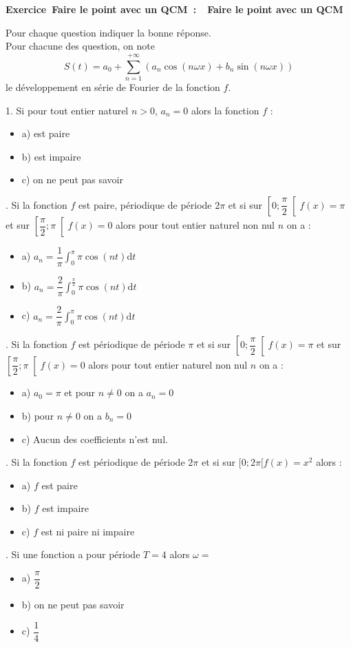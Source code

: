 \documentclass[11pt,a4paper]{article}
\newcounter{numexos}%
\newcommand{\bex}[2]{%
\def\bextitle{#1}%
\addtocounter{numexos}{1}%
\begin{tcolorbox}[colback=white,colframe=black!30,arc=3pt,boxrule=0.6pt,
  left=4mm,right=4mm,top=1mm,bottom=2mm]%
  \textbf{Exercice~\thenumexos\ifx\bextitle\empty\else~:~~#1\fi}\par
  #2%
\end{tcolorbox}}
\begin{document}
\bex{Faire le point avec un QCM}{
Pour chaque question indiquer la bonne réponse. \\
Pour chacune des question, on note $$S(t)=a_0+ \sum\limits_{n=1}^{+\infty} (a_n\cos(n\omega x)+b_n\sin(n\omega x))$$ le développement en série de Fourier de la fonction $f$.  

\bigskip

1. Si pour tout entier naturel $n > 0$, $a_n=0$ alors la fonction $f$ :
\begin{itemize}[label=$\square$]
  \item   a) est paire
  \item   b) est impaire
  \item   c) on ne peut pas savoir
\end{itemize}
\bigskip
2. Si la fonction $f$ est paire, périodique de période $2\pi$ et si sur $\left[0;\dfrac{\pi}{2}\right[ f(x) = \pi$ et sur $\left[\dfrac{\pi}{2}; \pi\right[ f(x) = 0$ alors pour tout entier naturel non nul $n$ on a : 
\begin{itemize}[label=$\square$]
\item   a) $a_n=\dfrac{1}{\pi}\displaystyle \int_0^{\pi} \pi \cos(nt) \mathrm{d}t$
\item   b) $a_n=\dfrac{2}{\pi}\displaystyle \int_0^{\frac{\pi}{2}} \pi \cos(nt) \mathrm{d}t$
\item   c) $a_n=\dfrac{2}{\pi}\displaystyle \int_0^{\pi} \pi \cos(nt) \mathrm{d}t$
\end{itemize}
\bigskip
3. Si la fonction $f$ est  périodique de période $\pi$ et si sur $\left[0;\dfrac{\pi}{2}\right[ f(x) = \pi$ et sur $\left[\dfrac{\pi}{2}; \pi\right[ f(x) = 0$ alors pour tout entier naturel non nul $n$ on a : 
\begin{itemize}[label=$\square$]
\item   a) $a_0=\pi$ et pour $n \ne 0$ on a $a_n=0$
\item   b) pour $n \ne 0$ on a $b_n=0$ 
\item   c) Aucun des coefficients n'est nul. 
\end{itemize}
\bigskip
4. Si la fonction $f$ est  périodique de période $2\pi$ et si sur $[0;2\pi[ f(x) = x^2$ alors : 
\begin{itemize}[label=$\square$]
\item   a) $f$ est paire
\item   b) $f$ est impaire
\item   c) $f$ est ni paire ni impaire
\end{itemize}
\bigskip
5. Si une fonction a pour période $T=4$ alors $\omega = $
\begin{itemize}[label=$\square$]
  \item   a) $\dfrac{\pi}{2}$
  \item   b) on ne peut pas savoir
  \item   c) $\dfrac{1}{4}$
  
\end{itemize}
}
\bigskip
\end{document}
